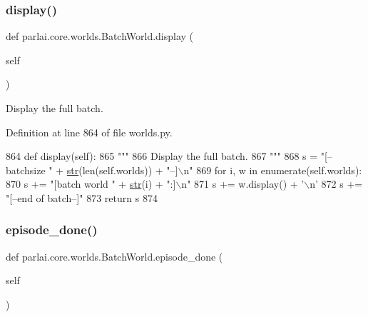 \subsubsection{\texorpdfstring{display()}{display()}}
{\footnotesize\ttfamily def parlai.\+core.\+worlds.\+Batch\+World.\+display (\begin{DoxyParamCaption}\item[{}]{self }\end{DoxyParamCaption})}

\begin{DoxyVerb}Display the full batch.
\end{DoxyVerb}
 

Definition at line 864 of file worlds.\+py.


\begin{DoxyCode}
864     \textcolor{keyword}{def }display(self):
865         \textcolor{stringliteral}{"""}
866 \textcolor{stringliteral}{        Display the full batch.}
867 \textcolor{stringliteral}{        """}
868         s = \textcolor{stringliteral}{"[--batchsize "} + \hyperlink{namespacegenerate__task__READMEs_a5b88452ffb87b78c8c85ececebafc09f}{str}(len(self.worlds)) + \textcolor{stringliteral}{"--]\(\backslash\)n"}
869         \textcolor{keywordflow}{for} i, w \textcolor{keywordflow}{in} enumerate(self.worlds):
870             s += \textcolor{stringliteral}{"[batch world "} + \hyperlink{namespacegenerate__task__READMEs_a5b88452ffb87b78c8c85ececebafc09f}{str}(i) + \textcolor{stringliteral}{":]\(\backslash\)n"}
871             s += w.display() + \textcolor{stringliteral}{'\(\backslash\)n'}
872         s += \textcolor{stringliteral}{"[--end of batch--]"}
873         \textcolor{keywordflow}{return} s
874 
\end{DoxyCode}
\mbox{\label{classparlai_1_1core_1_1worlds_1_1BatchWorld_aa3ef1275372635073ba5cba7df0d1f5d}} 
\subsubsection{\texorpdfstring{episode\+\_\+done()}{episode\_done()}}
{\footnotesize\ttfamily def parlai.\+core.\+worlds.\+Batch\+World.\+episode\+\_\+done (\begin{DoxyParamCaption}\item[{}]{self }\end{DoxyParamCaption})}

